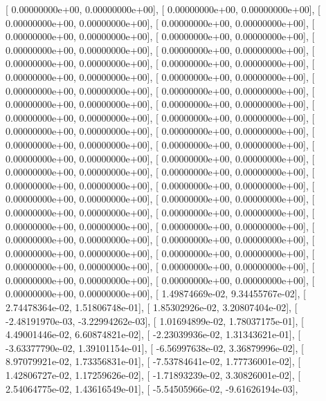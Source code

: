 \documentclass{article}
\begin{document}
       [  0.00000000e+00,   0.00000000e+00],
       [  0.00000000e+00,   0.00000000e+00],
       [  0.00000000e+00,   0.00000000e+00],
       [  0.00000000e+00,   0.00000000e+00],
       [  0.00000000e+00,   0.00000000e+00],
       [  0.00000000e+00,   0.00000000e+00],
       [  0.00000000e+00,   0.00000000e+00],
       [  0.00000000e+00,   0.00000000e+00],
       [  0.00000000e+00,   0.00000000e+00],
       [  0.00000000e+00,   0.00000000e+00],
       [  0.00000000e+00,   0.00000000e+00],
       [  0.00000000e+00,   0.00000000e+00],
       [  0.00000000e+00,   0.00000000e+00],
       [  0.00000000e+00,   0.00000000e+00],
       [  0.00000000e+00,   0.00000000e+00],
       [  0.00000000e+00,   0.00000000e+00],
       [  0.00000000e+00,   0.00000000e+00],
       [  0.00000000e+00,   0.00000000e+00],
       [  0.00000000e+00,   0.00000000e+00],
       [  0.00000000e+00,   0.00000000e+00],
       [  0.00000000e+00,   0.00000000e+00],
       [  0.00000000e+00,   0.00000000e+00],
       [  0.00000000e+00,   0.00000000e+00],
       [  0.00000000e+00,   0.00000000e+00],
       [  0.00000000e+00,   0.00000000e+00],
       [  0.00000000e+00,   0.00000000e+00],
       [  0.00000000e+00,   0.00000000e+00],
       [  0.00000000e+00,   0.00000000e+00],
       [  0.00000000e+00,   0.00000000e+00],
       [  0.00000000e+00,   0.00000000e+00],
       [  0.00000000e+00,   0.00000000e+00],
       [  0.00000000e+00,   0.00000000e+00],
       [  0.00000000e+00,   0.00000000e+00],
       [  0.00000000e+00,   0.00000000e+00],
       [  0.00000000e+00,   0.00000000e+00],
       [  0.00000000e+00,   0.00000000e+00],
       [  0.00000000e+00,   0.00000000e+00],
       [  0.00000000e+00,   0.00000000e+00],
       [  0.00000000e+00,   0.00000000e+00],
       [  0.00000000e+00,   0.00000000e+00],
       [  0.00000000e+00,   0.00000000e+00],
       [  0.00000000e+00,   0.00000000e+00],
       [  0.00000000e+00,   0.00000000e+00],
       [  1.49874669e-02,   9.34455767e-02],
       [  2.74478364e-02,   1.51806748e-01],
       [  1.85302926e-02,   3.20807404e-02],
       [ -2.48191970e-03,  -3.22994262e-03],
       [  1.01694899e-02,   1.78037175e-01],
       [  4.49001446e-02,   6.60874821e-02],
       [ -2.23039936e-02,   1.31343621e-01],
       [ -3.63377790e-02,   1.39101154e-01],
       [ -6.56997638e-02,   3.36879996e-02],
       [  8.97079921e-02,   1.73356831e-01],
       [ -7.53784641e-02,   1.77736001e-02],
       [  1.42806727e-02,   1.17259626e-02],
       [ -1.71893239e-02,   3.30826001e-02],
       [  2.54064775e-02,   1.43616549e-01],
       [ -5.54505966e-02,  -9.61626194e-03],
\end{document}
